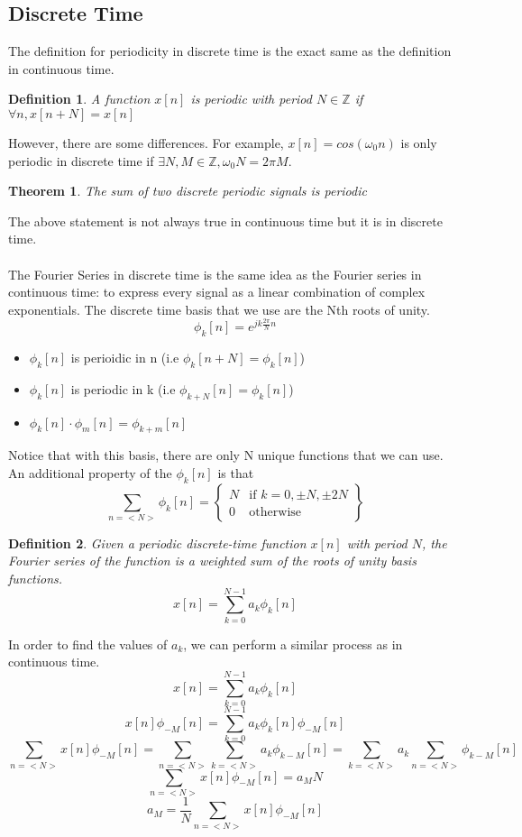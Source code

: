 \documentclass{article}
\newtheorem{theorem}{Theorem}
\newtheorem{definition}{Definition}
\begin{document}
\subsection{Discrete Time}
The definition for periodicity in discrete time is the exact same as the definition in continuous time.
\begin{definition}
    A function $x[n]$ is periodic with period $N \in \mathbb{Z}$ if $\forall n, x[n+N]=x[n]$
\end{definition}
However, there are some differences. For example, $x[n] = cos(\omega_0 n)$
is only periodic in discrete time if $\exists N, M \in \mathbb{Z}, \omega_0 N = 2 \pi M$.
\begin{theorem}
    The sum of two discrete periodic signals is periodic
\end{theorem}
The above statement is not always true in continuous time but it is in discrete time.\\\\
The Fourier Series in discrete time is the same idea as the Fourier series in continuous time: 
to express every signal as a linear combination of complex exponentials.
The discrete time basis that we use are the Nth roots of unity.
$$\phi_k[n] = e^{jk\frac{2\pi}{N}n}$$
\begin{itemize}
    \item $\phi_k[n]$ is perioidic in n (i.e $\phi_k[n+N] = \phi_k[n]$)
    \item $\phi_k[n]$ is periodic in k (i.e $\phi_{k+N}[n] = \phi_k[n]$)
    \item $\phi_k[n]\cdot \phi_m[n] = \phi_{k + m}[n]$
\end{itemize}
Notice that with this basis, there are only N unique functions that we can use.
An additional property of the $\phi_k[n]$ is that
\[
    \sum_{n=<N>}{\phi_k[n]} = \left\{
        \begin{array}{cc}
            N &\text{if } k = 0,\pm N, \pm 2N\\
            0 &\text{otherwise} 
        \end{array}
    \right\}
\]
\begin{definition}
    Given a periodic discrete-time function $x[n]$ with period $N$, 
    the Fourier series of the function is a weighted sum of the roots of unity basis functions.
    $$x[n] = \sum_{k=0}^{N-1}{a_k\phi_k[n]}$$
\end{definition}
In order to find the values of $a_k$, we can perform a similar process as in continuous time.
$$x[n] = \sum_{k=0}^{N-1}{a_k\phi_k[n]}$$
$$x[n]\phi_{-M}[n] = \sum_{k=0}^{N-1}{a_k\phi_k[n]\phi_{-M}[n]}$$
$$\sum_{n=<N>}{x[n]\phi_{-M}[n]} = \sum_{n=<N>}{\sum_{k=<N>}{a_k\phi_{k-M}[n]}} = \sum_{k=<N>}{a_k\sum_{n=<N>}{\phi_{k-M}[n]}}$$
$$\sum_{n=<N>}{x[n]\phi_{-M}[n]} = a_MN$$
$$a_M = \frac{1}{N}\sum_{n=<N>}{x[n]\phi_{-M}[n]}$$
\end{document}

